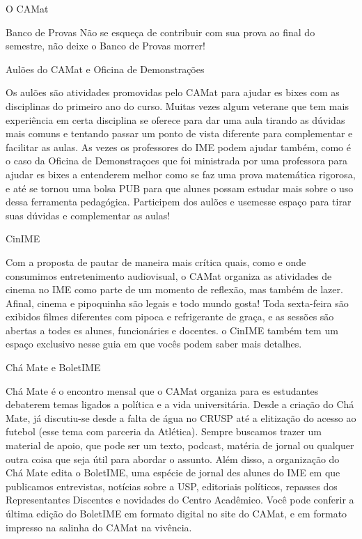 \begin{secao}{O CAMat}
\begin{subsecao}{Banco de Provas}
Não se esqueça de contribuir com sua prova ao final do semestre, não
deixe o Banco de Provas morrer! 

\end{subsecao}

\begin{subsecao}{Aulões do CAMat e Oficina de Demonstrações}

Os aulões são atividades promovidas pelo CAMat para ajudar es bixes com as
disciplinas do primeiro ano do curso. Muitas vezes algum veterane que tem mais
experiência em certa disciplina se oferece para dar uma aula tirando as dúvidas
mais comuns e tentando passar um ponto de vista diferente para complementar e facilitar
as aulas. As vezes os professores do IME podem ajudar também, como é o caso da Oficina de Demonstraçoes
que foi ministrada por uma professora para ajudar es bixes a entenderem melhor como
se faz uma prova matemática rigorosa, e até se tornou uma bolsa PUB para que alunes
possam estudar mais sobre o uso dessa ferramenta pedagógica. 
Participem dos aulões e usemesse espaço para tirar suas dúvidas e complementar as aulas!

\end{subsecao}

\begin{subsecao}{CinIME}

Com a proposta de pautar de maneira mais crítica quais, como e onde consumimos 
entretenimento audiovisual, o CAMat organiza as atividades de cinema no IME 
como parte de um momento de reflexão, mas também de lazer. Afinal, cinema e 
pipoquinha são legais e todo mundo gosta! Toda sexta-feira são exibidos filmes 
diferentes com pipoca e refrigerante de graça, e as sessões são abertas a todes 
es alunes, funcionáries e docentes. o CinIME também tem um espaço exclusivo nesse
guia em que vocês podem saber mais detalhes.

\end{subsecao}

\begin{subsecao}{Chá Mate e BoletIME}

Chá Mate é o encontro mensal que o CAMat organiza para es estudantes debaterem temas
ligados a política e a vida universitária. Desde a criação do Chá Mate, já discutiu-se
desde a falta de água no CRUSP até a elitização do acesso ao futebol (esse tema com parceria
da Atlética). Sempre buscamos trazer um material de apoio, que pode ser um texto, podcast, matéria
de jornal ou qualquer outra coisa que seja útil para abordar o assunto. 
Além disso, a organização do Chá Mate edita o BoletIME, uma espécie de jornal des alunes do IME em
que publicamos entrevistas, notícias sobre a USP, editoriais políticos, repasses dos Representantes
Discentes e novidades do Centro Acadêmico. Você pode conferir a última edição do BoletIME em formato 
digital no site do CAMat, e em formato impresso na salinha do CAMat na vivência.


\end{subsecao}
\end{secao}
